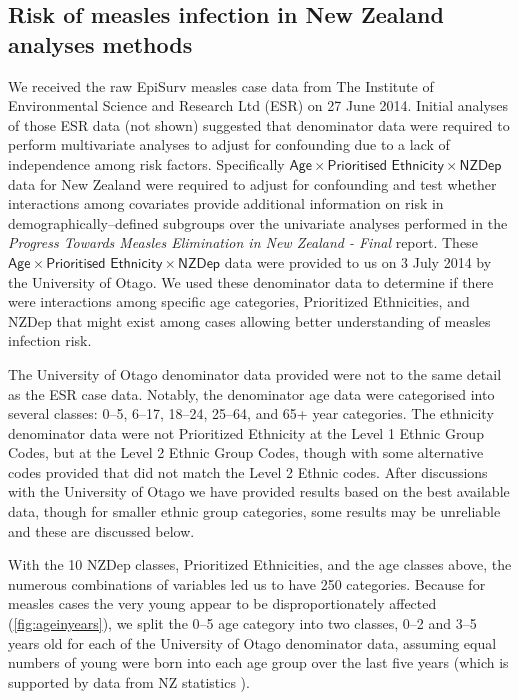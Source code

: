 \documentclass{article}
\begin{document}
\subsection{Risk of measles infection in New Zealand analyses methods}
\label{sub:regression}
We received the raw EpiSurv measles case data from The Institute of Environmental Science and Research Ltd (ESR) on 27 June 2014. Initial analyses of those ESR data (not shown) suggested that denominator data were required to perform multivariate analyses to adjust for confounding due to a lack of independence among risk factors. Specifically $\textsf{Age} \times \textsf{Prioritised Ethnicity} \times \textsf{NZDep}$ data for New Zealand were required to adjust for confounding and test whether interactions among covariates provide additional information on risk in demographically--defined subgroups over the univariate analyses performed in the \emph{Progress Towards Measles Elimination in New Zealand - Final} report. These $\textsf{Age} \times \textsf{Prioritised Ethnicity} \times \textsf{NZDep}$ data were provided to us on 3 July 2014 by the University of Otago. We used these denominator data to determine if there were interactions among specific age categories, Prioritized Ethnicities, and NZDep that might exist among cases allowing better understanding of measles infection risk.

The University of Otago denominator data provided were not to the same detail as the ESR case data. Notably, the denominator age data were categorised into several classes: 0--5, 6--17, 18--24, 25--64, and 65+ year categories. The ethnicity denominator data were not Prioritized Ethnicity at the Level 1 Ethnic Group Codes, but at the Level 2 Ethnic Group Codes, though with some alternative codes provided that did not match the Level 2 Ethnic codes. After discussions with the University of Otago we have provided results based on the best available data, though for smaller ethnic group categories, some results may be unreliable and these are discussed below.

With the 10 NZDep classes, Prioritized Ethnicities, and the age classes above, the numerous combinations of variables led us to have 250 categories. Because for measles cases the very young appear to be disproportionately affected (\autoref{fig:ageinyears}), we split the 0--5 age category into two classes, 0--2 and 3--5 years old for each of the University of Otago denominator data, assuming equal numbers of young were born into each age group over the last five years (which is supported by data from NZ statistics \citep{stats14}).
\end{document}
